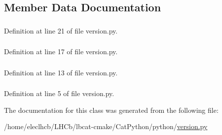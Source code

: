 \subsection{Member Data Documentation}
\hypertarget{classversion_1_1version_aa401bc80238c2e5f09faf35940a49343}{
\subsubsection[{copyright}]{}}
\label{classversion_1_1version_aa401bc80238c2e5f09faf35940a49343}


Definition at line 21 of file version.py.\hypertarget{classversion_1_1version_ac0217c7361fc9a925fa51c58610dfc69}{
\subsubsection[{date}]{}}
\label{classversion_1_1version_ac0217c7361fc9a925fa51c58610dfc69}


Definition at line 17 of file version.py.\hypertarget{classversion_1_1version_aae0cbe7734a585046f80415c90f7bdb0}{
\subsubsection[{number}]{}}
\label{classversion_1_1version_aae0cbe7734a585046f80415c90f7bdb0}


Definition at line 13 of file version.py.\hypertarget{classversion_1_1version_ac8aa5f4a7b6d0c1119f87488296fdb15}{
\subsubsection[{versfile}]{}}
\label{classversion_1_1version_ac8aa5f4a7b6d0c1119f87488296fdb15}


Definition at line 5 of file version.py.

The documentation for this class was generated from the following file:\begin{DoxyCompactItemize}
\item 
/home/eleclhcb/LHCb/lbcat-\/cmake/CatPython/python/\hyperlink{version_8py}{version.py}\end{DoxyCompactItemize}
